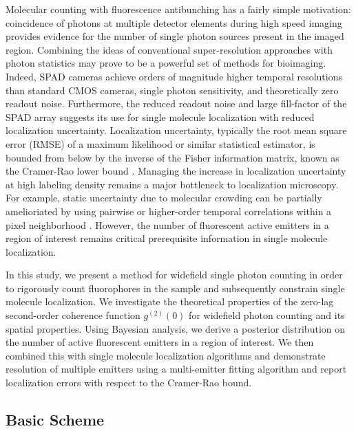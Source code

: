 \documentclass[a4paper, twocolumn, superscriptaddress,prl]{revtex4}  %
\begin{document}
Molecular counting with fluorescence antibunching has a fairly simple motivation: coincidence of photons at multiple detector elements during high speed imaging provides evidence for the number of single photon sources present in the imaged region. Combining the ideas of conventional super-resolution approaches with photon statistics may prove to be a powerful set of methods for bioimaging. Indeed, SPAD cameras achieve orders of magnitude higher temporal resolutions than standard CMOS cameras, single photon sensitivity, and theoretically zero readout noise. Furthermore, the reduced readout noise and large fill-factor of the SPAD array suggests its use for single molecule localization with reduced localization uncertainty. Localization uncertainty, typically the root mean square error (RMSE) of a maximum likelihood or similar statistical estimator, is bounded from below by the inverse of the Fisher information matrix, known as the Cramer-Rao lower bound \citep{Chao2016}. Managing the increase in localization uncertainty at high labeling density remains a major bottleneck to localization microscopy. For example, static uncertainty due to molecular crowding can be partially amelioriated by using pairwise or higher-order temporal correlations within a pixel neighborhood \citep{Dertinger2009}. However, the number of fluorescent active emitters in a region of interest remains critical prerequisite information in single molecule localization.

In this study, we present a method for widefield single photon counting in order to rigorously count fluorophores in the sample and subsequently constrain single molecule localization. We investigate the theoretical properties of the zero-lag second-order coherence function $g^{(2)}(0)$ for widefield photon counting and its spatial properties. Using Bayesian analysis, we derive a posterior distribution on the number of active fluorescent emitters in a region of interest. We then combined this with single molecule localization algorithms and demonstrate resolution of multiple emitters using a multi-emitter fitting algorithm and report localization errors with respect to the Cramer-Rao bound.

\subsection{Basic Scheme}
\end{document}
